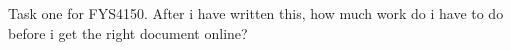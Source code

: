 \documentclass{article}
\begin{document}
Task one for FYS4150. After i have written this, how much work do i have to do before i get the right document online?
\end{document}
